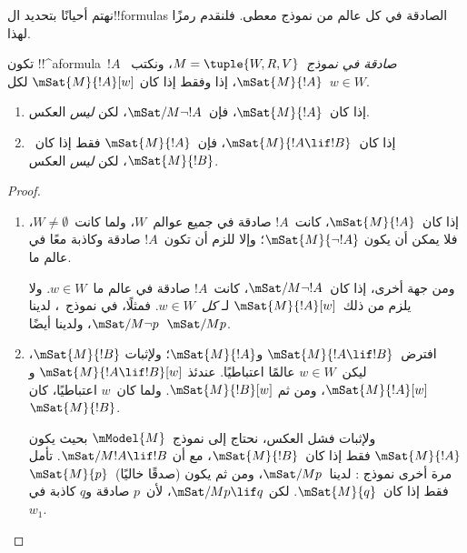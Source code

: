 \documentclass[../../../include/open-logic-section]{subfiles}
\begin{document}


نهتم أحيانًا بتحديد ال!!{formula}s الصادقة في كل عالم من نموذج معطى.
فلنقدم رمزًا لهذا.

\begin{defn}
  تكون !!^a{formula}~$!A$ \emph{صادقة في نموذج}~$M = \tuple{W, R,
    V}$، ونكتب~$\mSat{M}{!A}$، إذا وفقط إذا كان
  $\mSat{M}{!A}[w]$ لكل~$w \in W$.
\end{defn}

\begin{prop}
  \begin{enumerate}
  \item إذا كان~$\mSat{M}{!A}$، فإن~$\mSat/{M}{\lnot !A}$، لكن
    \emph{ليس} العكس.
  \item إذا كان~$\mSat{M}{!A \lif !B}$، فإن~$\mSat{M}{!A}$ فقط إذا
    كان~$\mSat{M}{!B}$، لكن \emph{ليس} العكس.
  \end{enumerate}
\end{prop}

\begin{proof}
  \begin{enumerate}
  \item إذا كان~$\mSat{M}{!A}$، كانت~$!A$ صادقة في جميع عوالم~$W$،
    ولما كانت~$W \neq \emptyset$، فلا يمكن أن يكون
    $\mSat{M}{\lnot!A}$؛ وإلا للزم أن تكون~$!A$ صادقة وكاذبة معًا في
    عالم ما.

    ومن جهة أخرى، إذا كان~$\mSat/{M}{\lnot !A}$، كانت~$!A$ صادقة في
    عالم ما~$w \in W$. ولا يلزم من ذلك~$\mSat{M}{!A}[w]$ لـ
    \emph{كل}~$w \in W$. فمثلًا، في نموذج~، لدينا
    $\mSat/{M}{\lnot p}$، ولدينا أيضًا~$\mSat/{M}{p}$.
  \item افترض~$\mSat{M}{!A \lif !B}$ و$\mSat{M}{!A}$؛ ولإثبات
    $\mSat{M}{!B}$، ليكن~$w \in W$ عالمًا اعتباطيًا. عندئذ
    $\mSat{M}{!A \lif !B}[w]$ و$\mSat{M}{!A}[w]$، ومن ثم
    $\mSat{M}{!B}[w]$. ولما كان~$w$ اعتباطيًا، كان
    $\mSat{M}{!B}$.

    ولإثبات فشل العكس، نحتاج إلى نموذج~$\mModel{M}$ بحيث يكون
    $\mSat{M}{!A}$ فقط إذا كان~$\mSat{M}{!B}$، مع أن
    $\mSat/{M}{!A \lif !B}$. تأمل مرة أخرى نموذج
    : لدينا~$\mSat/{M}{p}$، ومن ثم يكون
    (صدقًا خاليًا)~$\mSat{M}{p}$ فقط إذا كان~$\mSat{M}{q}$. لكن
    $\mSat/{M}{p \lif q}$، لأن~$p$ صادقة و$q$ كاذبة في~$w_1$.
  \end{enumerate}
\end{proof}
\end{document}
